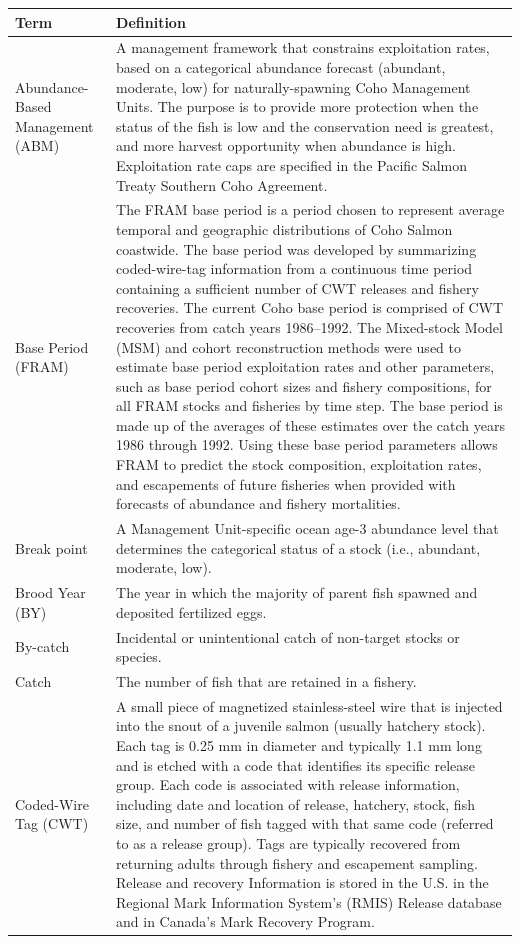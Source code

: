 \documentclass[
  letterpaper,
  DIV=11,
  numbers=noendperiod]{scrartcl}
\begin{document}
\begin{table}
\fontsize{12.0pt}{14.4pt}\selectfont
\begin{tabular*}{\linewidth}{@{\extracolsep{\fill}}ll}
\toprule
Term & Definition \\ 
\midrule\addlinespace[2.5pt]
Abundance-Based Management (ABM) & A management framework that constrains exploitation rates, based on a categorical abundance forecast (abundant, moderate, low) for naturally-spawning Coho Management Units. The purpose is to provide more protection when the status of the fish is low and the conservation need is greatest, and more harvest opportunity when abundance is high. Exploitation rate caps are specified in the Pacific Salmon Treaty Southern Coho Agreement. \\ 
Base Period (FRAM) & The FRAM base period is a period chosen to represent average temporal and geographic distributions of Coho Salmon coastwide. The base period was developed by summarizing coded-wire-tag information from a continuous time period containing a sufficient number of CWT releases and fishery recoveries. The current Coho base period is comprised of CWT recoveries from catch years 1986–1992. The Mixed-stock Model (MSM) and cohort reconstruction methods were used to estimate base period exploitation rates and other parameters, such as base period cohort sizes and fishery compositions, for all FRAM stocks and fisheries by time step. The base period is made up of the averages of these estimates over the catch years 1986 through 1992. Using these base period parameters allows FRAM to predict the stock composition, exploitation rates, and escapements of future fisheries when provided with forecasts of abundance and fishery mortalities. \\ 
Break point & A Management Unit-specific ocean age-3 abundance level that determines the categorical status of a stock (i.e., abundant, moderate, low). \\ 
Brood Year (BY) & The year in which the majority of parent fish spawned and deposited fertilized eggs. \\ 
By-catch & Incidental or unintentional catch of non-target stocks or species. \\ 
Catch & The number of fish that are retained in a fishery. \\ 
Coded-Wire Tag (CWT) & A small piece of magnetized stainless-steel wire that is injected into the snout of a juvenile salmon (usually hatchery stock). Each tag is 0.25 mm in diameter and typically 1.1 mm long and is etched with a code that identifies its specific release group. Each code is associated with release information, including date and location of release, hatchery, stock, fish size, and number of fish tagged with that same code (referred to as a release group). Tags are typically recovered from returning adults through fishery and escapement sampling. Release and recovery Information is stored in the U.S. in the Regional Mark Information System's (RMIS) Release database and in Canada’s Mark Recovery Program. \\ 

\end{tabular*}
\end{table}
\end{document}
